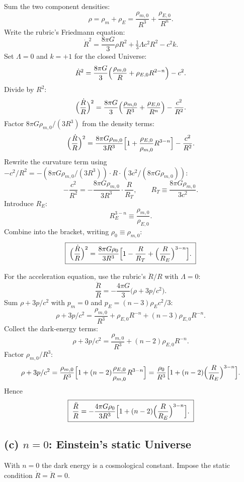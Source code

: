 \documentclass[11pt]{article}
\begin{document}
Sum the two component densities:
\[
\rho=\rho_{m}+\rho_{E}=\frac{\rho_{m,0}}{R^{3}}+\frac{\rho_{E,0}}{R^{n}}.
\]
Write the rubric's Friedmann equation:
\[
\dot R^{2}=\frac{8\pi G}{3}\rho R^{2}+\tfrac{1}{3}\Lambda c^{2}R^{2}-c^{2}k.
\]
Set $\Lambda=0$ and $k=+1$ for the closed Universe:
\[
\dot R^{2}=\frac{8\pi G}{3}\Bigl(\frac{\rho_{m,0}}{R}+\rho_{E,0}R^{2-n}\Bigr)-c^{2}.
\]
Divide by $R^{2}$:
\[
\Bigl(\frac{\dot R}{R}\Bigr)^{2}=\frac{8\pi G}{3}\Bigl(\frac{\rho_{m,0}}{R^{3}}+\frac{\rho_{E,0}}{R^{n}}\Bigr)-\frac{c^{2}}{R^{2}}.
\]
Factor $8\pi G\rho_{m,0}/(3R^{3})$ from the density terms:
\[
\Bigl(\frac{\dot R}{R}\Bigr)^{2}=\frac{8\pi G\rho_{m,0}}{3R^{3}}\Bigl[1+\frac{\rho_{E,0}}{\rho_{m,0}}R^{3-n}\Bigr]-\frac{c^{2}}{R^{2}}.
\]
Rewrite the curvature term using $-c^{2}/R^{2}=-(8\pi G\rho_{m,0}/(3R^{3}))\cdot R\cdot(3c^{2}/(8\pi G\rho_{m,0}))$:
\[
-\frac{c^{2}}{R^{2}}=-\frac{8\pi G\rho_{m,0}}{3R^{3}}\cdot\frac{R}{R_{T}},\qquad R_{T}\equiv\frac{8\pi G\rho_{m,0}}{3c^{2}}.
\]
Introduce $R_{E}$:
\[
R_{E}^{3-n}\equiv\frac{\rho_{m,0}}{\rho_{E,0}}.
\]
Combine into the bracket, writing $\rho_{0}\equiv\rho_{m,0}$:
\begin{equation}
\boxed{\;\Bigl(\frac{\dot R}{R}\Bigr)^{2}=\frac{8\pi G\rho_{0}}{3R^{3}}\Bigl[1-\frac{R}{R_{T}}+\Bigl(\frac{R}{R_{E}}\Bigr)^{3-n}\Bigr].\;}
\label{eq:Friedmann}
\end{equation}

For the acceleration equation, use the rubric's $\ddot R/R$ with $\Lambda=0$:
\[
\frac{\ddot R}{R}=-\frac{4\pi G}{3}\bigl(\rho+3p/c^{2}\bigr).
\]
Sum $\rho+3p/c^{2}$ with $p_{m}=0$ and $p_{E}=(n-3)\rho_{E}c^{2}/3$:
\[
\rho+3p/c^{2}=\frac{\rho_{m,0}}{R^{3}}+\rho_{E,0}R^{-n}+(n-3)\rho_{E,0}R^{-n}.
\]
Collect the dark-energy terms:
\[
\rho+3p/c^{2}=\frac{\rho_{m,0}}{R^{3}}+(n-2)\rho_{E,0}R^{-n}.
\]
Factor $\rho_{m,0}/R^{3}$:
\[
\rho+3p/c^{2}=\frac{\rho_{m,0}}{R^{3}}\Bigl[1+(n-2)\frac{\rho_{E,0}}{\rho_{m,0}}R^{3-n}\Bigr]=\frac{\rho_{0}}{R^{3}}\Bigl[1+(n-2)\Bigl(\frac{R}{R_{E}}\Bigr)^{3-n}\Bigr].
\]
Hence
\begin{equation}
\boxed{\;\frac{\ddot R}{R}=-\frac{4\pi G\rho_{0}}{3R^{3}}\Bigl[1+(n-2)\Bigl(\frac{R}{R_{E}}\Bigr)^{3-n}\Bigr].\;}
\label{eq:Raccel}
\end{equation}

\subsection*{(c) $n=0$: Einstein's static Universe}

With $n=0$ the dark energy is a cosmological constant.  Impose the static condition $\dot R=\ddot R=0$.
\end{document}
